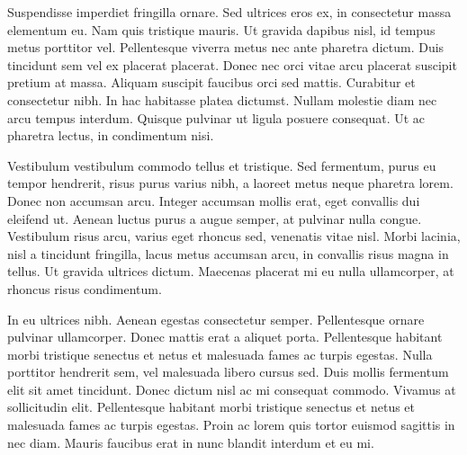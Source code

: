 
Suspendisse imperdiet fringilla ornare. Sed ultrices eros ex, in consectetur massa elementum eu. Nam quis tristique mauris. Ut gravida dapibus nisl, id tempus metus porttitor vel. Pellentesque viverra metus nec ante pharetra dictum. Duis tincidunt sem vel ex placerat placerat. Donec nec orci vitae arcu placerat suscipit pretium at massa. Aliquam suscipit faucibus orci sed mattis. Curabitur et consectetur nibh. In hac habitasse platea dictumst. Nullam molestie diam nec arcu tempus interdum. Quisque pulvinar ut ligula posuere consequat. Ut ac pharetra lectus, in condimentum nisi.

Vestibulum vestibulum commodo tellus et tristique. Sed fermentum, purus eu tempor hendrerit, risus purus varius nibh, a laoreet metus neque pharetra lorem. Donec non accumsan arcu. Integer accumsan mollis erat, eget convallis dui eleifend ut. Aenean luctus purus a augue semper, at pulvinar nulla congue. Vestibulum risus arcu, varius eget rhoncus sed, venenatis vitae nisl. Morbi lacinia, nisl a tincidunt fringilla, lacus metus accumsan arcu, in convallis risus magna in tellus. Ut gravida ultrices dictum. Maecenas placerat mi eu nulla ullamcorper, at rhoncus risus condimentum.

In eu ultrices nibh. Aenean egestas consectetur semper. Pellentesque ornare pulvinar ullamcorper. Donec mattis erat a aliquet porta. Pellentesque habitant morbi tristique senectus et netus et malesuada fames ac turpis egestas. Nulla porttitor hendrerit sem, vel malesuada libero cursus sed. Duis mollis fermentum elit sit amet tincidunt. Donec dictum nisl ac mi consequat commodo. Vivamus at sollicitudin elit. Pellentesque habitant morbi tristique senectus et netus et malesuada fames ac turpis egestas. Proin ac lorem quis tortor euismod sagittis in nec diam. Mauris faucibus erat in nunc blandit interdum et eu mi.



